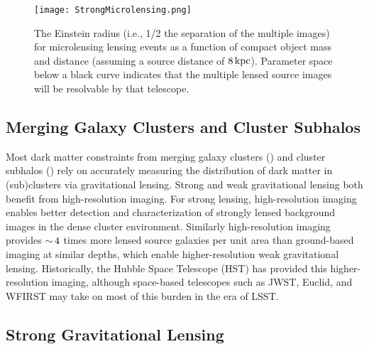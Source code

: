 \begin{figure}
\label{fig:strong_microlensing}
\centering
\texttt{[image: StrongMicrolensing.png]}
\caption{The Einstein radius (i.e., 1/2 the separation of the multiple images) for microlensing lensing events as a function of compact object mass and distance (assuming a source distance of $8\mathrm{\,kpc}$). Parameter space below a black curve indicates that the multiple lensed source images will be resolvable by that telescope. }
\end{figure}

\subsection{Merging Galaxy Clusters and Cluster Subhalos}

Most dark matter constraints from merging galaxy clusters () and cluster subhalos () rely on accurately measuring the distribution of dark matter in (sub)clusters via gravitational lensing.
Strong and weak gravitational lensing both benefit from high-resolution imaging.
For strong lensing, high-resolution imaging enables better detection and characterization of strongly lensed background images in the dense cluster environment.
Similarly high-resolution imaging provides $ {\sim}\,4$ times more lensed source galaxies per unit area than ground-based imaging at similar depths, which enable higher-resolution weak gravitational lensing.
Historically, the Hubble Space Telescope (HST) has provided this higher-resolution imaging, although space-based telescopes such as JWST, Euclid, and WFIRST may take on most of this burden in the era of LSST.

\subsection{Strong Gravitational Lensing}
\label{sec:SLcomplement}


